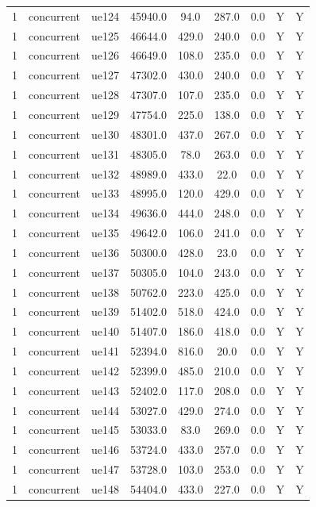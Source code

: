 \begin{table}[ht]
\begin{tabular}{|c|c|c|c|c|c|c|c|c|}
1 & concurrent & ue124 & 45940.0 & 94.0 & 287.0 & 0.0 & Y & Y \\
1 & concurrent & ue125 & 46644.0 & 429.0 & 240.0 & 0.0 & Y & Y \\
1 & concurrent & ue126 & 46649.0 & 108.0 & 235.0 & 0.0 & Y & Y \\
1 & concurrent & ue127 & 47302.0 & 430.0 & 240.0 & 0.0 & Y & Y \\
1 & concurrent & ue128 & 47307.0 & 107.0 & 235.0 & 0.0 & Y & Y \\
1 & concurrent & ue129 & 47754.0 & 225.0 & 138.0 & 0.0 & Y & Y \\
1 & concurrent & ue130 & 48301.0 & 437.0 & 267.0 & 0.0 & Y & Y \\
1 & concurrent & ue131 & 48305.0 & 78.0 & 263.0 & 0.0 & Y & Y \\
1 & concurrent & ue132 & 48989.0 & 433.0 & 22.0 & 0.0 & Y & Y \\
1 & concurrent & ue133 & 48995.0 & 120.0 & 429.0 & 0.0 & Y & Y \\
1 & concurrent & ue134 & 49636.0 & 444.0 & 248.0 & 0.0 & Y & Y \\
1 & concurrent & ue135 & 49642.0 & 106.0 & 241.0 & 0.0 & Y & Y \\
1 & concurrent & ue136 & 50300.0 & 428.0 & 23.0 & 0.0 & Y & Y \\
1 & concurrent & ue137 & 50305.0 & 104.0 & 243.0 & 0.0 & Y & Y \\
1 & concurrent & ue138 & 50762.0 & 223.0 & 425.0 & 0.0 & Y & Y \\
1 & concurrent & ue139 & 51402.0 & 518.0 & 424.0 & 0.0 & Y & Y \\
1 & concurrent & ue140 & 51407.0 & 186.0 & 418.0 & 0.0 & Y & Y \\
1 & concurrent & ue141 & 52394.0 & 816.0 & 20.0 & 0.0 & Y & Y \\
1 & concurrent & ue142 & 52399.0 & 485.0 & 210.0 & 0.0 & Y & Y \\
1 & concurrent & ue143 & 52402.0 & 117.0 & 208.0 & 0.0 & Y & Y \\
1 & concurrent & ue144 & 53027.0 & 429.0 & 274.0 & 0.0 & Y & Y \\
1 & concurrent & ue145 & 53033.0 & 83.0 & 269.0 & 0.0 & Y & Y \\
1 & concurrent & ue146 & 53724.0 & 433.0 & 257.0 & 0.0 & Y & Y \\
1 & concurrent & ue147 & 53728.0 & 103.0 & 253.0 & 0.0 & Y & Y \\
1 & concurrent & ue148 & 54404.0 & 433.0 & 227.0 & 0.0 & Y & Y \\

\end{tabular}
\end{table}
